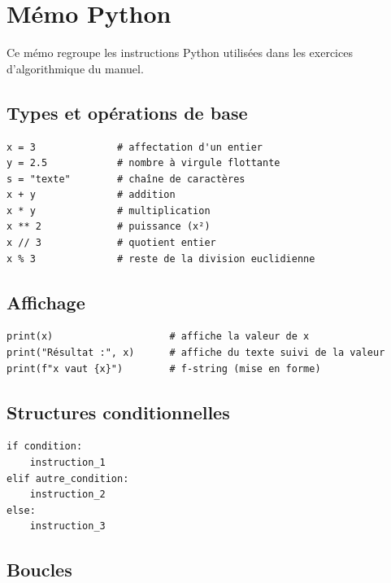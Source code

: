 
\chapter*{Mémo Python}

Ce mémo regroupe les instructions Python utilisées dans les exercices
d'algorithmique du manuel.

\section*{Types et opérations de base}

\begin{verbatim}
x = 3              # affectation d'un entier
y = 2.5            # nombre à virgule flottante
s = "texte"        # chaîne de caractères
x + y              # addition
x * y              # multiplication
x ** 2             # puissance (x²)
x // 3             # quotient entier
x % 3              # reste de la division euclidienne
\end{verbatim}

\section*{Affichage}

\begin{verbatim}
print(x)                    # affiche la valeur de x
print("Résultat :", x)      # affiche du texte suivi de la valeur
print(f"x vaut {x}")        # f-string (mise en forme)
\end{verbatim}

\section*{Structures conditionnelles}

\begin{verbatim}
if condition:
    instruction_1
elif autre_condition:
    instruction_2
else:
    instruction_3
\end{verbatim}

\section*{Boucles}

